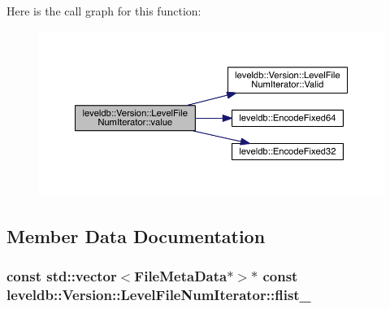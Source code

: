 Here is the call graph for this function\+:\nopagebreak
\begin{figure}[H]
\begin{center}
\leavevmode
\includegraphics[width=350pt]{classleveldb_1_1_version_1_1_level_file_num_iterator_ac09a8ed595aca29d90e6af91e80a4f00_cgraph}
\end{center}
\end{figure}




\subsection{Member Data Documentation}
\hypertarget{classleveldb_1_1_version_1_1_level_file_num_iterator_af4ccef3c73e3a26cb7289640e1ad3677}{}
\subsubsection[{flist\+\_\+}]{\setlength{\rightskip}{0pt plus 5cm}const std\+::vector$<${\bf File\+Meta\+Data}$\ast$$>$$\ast$ const leveldb\+::\+Version\+::\+Level\+File\+Num\+Iterator\+::flist\+\_\+\hspace{0.3cm}{\ttfamily [private]}}\label{classleveldb_1_1_version_1_1_level_file_num_iterator_af4ccef3c73e3a26cb7289640e1ad3677}
\hypertarget{classleveldb_1_1_version_1_1_level_file_num_iterator_ad8b3dcc45dfb991e9aabcd751b5b5138}{}
